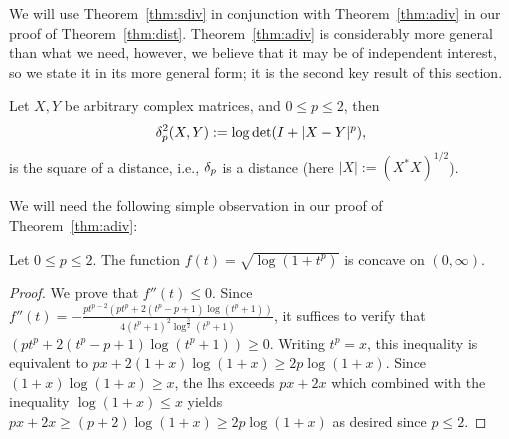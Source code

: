 \documentclass[11pt]{article}
\begin{document}
We will use Theorem~\ref{thm:sdiv} in conjunction with Theorem~\ref{thm:adiv} in our proof of Theorem~\ref{thm:dist}. Theorem~\ref{thm:adiv} is considerably more general than what we need, however, we believe that it may be of independent interest, so we state it in its more general form; it is the second key result of this section.
\begin{theorem}
  \label{thm:adiv}
  Let $X, Y$ be arbitrary complex matrices, and $0\le p \le 2$, then 
  \begin{equation}
    \label{eq:18}
    \delta_p^2(X,Y) := \log\det(I + |X-Y|^p),
  \end{equation}
  is the square of a distance, i.e., $\delta_p$ is a distance (here $|X| := (X^*X)^{1/2}$).
\end{theorem}
\noindent We will need the following simple observation in our proof of Theorem~\ref{thm:adiv}:
\begin{lemma}
  \label{lem:cve} Let $0\le p \le 2$. The function $f(t)=\sqrt{\log(1+t^p)}$ is concave on $(0,\infty)$.
\end{lemma}
\begin{proof}
  We prove that $f''(t) \le 0$. Since $f''(t)=-\frac{p t^{p-2} \left(p t^p+2 \left(t^p-p+1\right) \log \left(t^p+1\right)\right)}{4 \left(t^p+1\right)^2 \log ^{\frac{3}{2}}\left(t^p+1\right)}$, it suffices to verify that $\left(p t^p+2 \left(t^p-p+1\right) \log \left(t^p+1\right)\right) \ge 0$. Writing $t^p=x$, this inequality is equivalent to
  $p x + 2 (1+x)\log(1+x) \ge 2p\log(1+x)$. Since $(1+x)\log(1+x) \ge x$, the lhs exceeds $px+2x$ which combined with the inequality $\log(1+x) \le x$ yields $px+2x \ge (p+2)\log(1+x) \ge 2p\log(1+x)$ as desired since $p\le 2$.
\end{proof}
\end{document}
